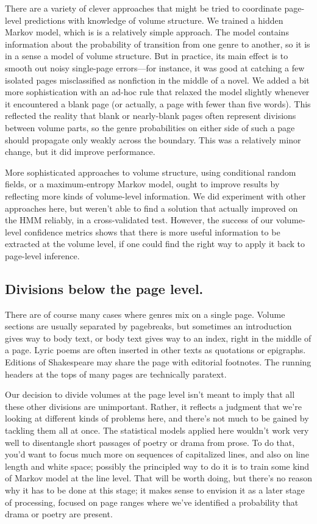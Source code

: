 \documentclass[paper=a4, fontsize=12pt]{scrartcl}
\numberwithin{equation}{section}		%
\numberwithin{figure}{section}			%
\numberwithin{table}{section}				%
\begin{document}
There are a variety of clever approaches that might be tried to coordinate page-level predictions with knowledge of volume structure. We trained a hidden Markov model, which is is a relatively simple approach. The model contains information about the probability of transition from one genre to another, so it is in a sense a model of volume structure. But in practice, its main effect is to smooth out noisy single-page errors---for instance, it was good at catching a few isolated pages misclassified as nonfiction in the middle of a novel. We added a bit more sophistication with an ad-hoc rule that relaxed the model slightly whenever it encountered a blank page (or actually, a page with fewer than five words). This reflected the reality that blank or nearly-blank pages often represent divisions between volume parts, so the genre probabilities on either side of such a page should propagate only weakly across the boundary. This was a relatively minor change, but it did improve performance.

More sophisticated approaches to volume structure, using conditional random fields, or a maximum-entropy Markov model, ought to improve results by reflecting more kinds of volume-level information. We did experiment with other approaches here, but weren't able to find a solution that actually improved on the HMM reliably, in a cross-validated test. However, the success of our volume-level confidence metrics shows that there is more useful information to be extracted at the volume level, if one could find the right way to apply it back to page-level inference.

\subsection{Divisions below the page level.}

There are of course many cases where genres mix on a single page. Volume sections are usually separated by pagebreaks, but sometimes an introduction gives way to body text, or body text gives way to an index, right in the middle of a page. Lyric poems are often inserted in other texts as quotations or epigraphs. Editions of Shakespeare may share the page with editorial footnotes. The running headers at the tops of many pages are technically paratext.

Our decision to divide volumes at the page level isn't meant to imply that all these other divisions are unimportant. Rather, it reflects a judgment that we're looking at different kinds of problems here, and there's not much to be gained by tackling them all at once. The statistical models applied here wouldn't work very well to disentangle short passages of poetry or drama from prose. To do that, you'd want to focus much more on sequences of capitalized lines, and also on line length and white space; possibly the principled way to do it is to train some kind of Markov model at the line level. That will be worth doing, but there's no reason why it has to be done at this stage; it makes sense to envision it as a later stage of processing, focused on page ranges where we've identified a probability that drama or poetry are present.
\end{document}

